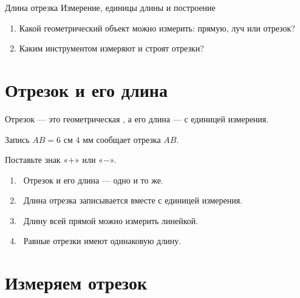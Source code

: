 
\worksheettitle
  {Длина отрезка}
  {Измерение, единицы длины и построение}

\studentnameblock

\begin{checkpointbox}
  \begin{enumerate}[label=\textbf{\arabic*.},itemsep=0.45em]
    \item Какой геометрический объект можно измерить: прямую, луч или
      отрезок? \answerblank[38mm]
    \item Каким инструментом измеряют и строят отрезки?
      \answerblank[42mm]
  \end{enumerate}
\end{checkpointbox}

\section{Отрезок и его длина}

\segmentlengthfigure

\begin{fillbox}[Дополните]
  Отрезок — это геометрическая \answerblank[30mm], а его длина —
  \answerblank[28mm] с единицей измерения.

  Запись \(AB=6\text{ см }4\text{ мм}\) сообщает
  \answerblank[50mm] отрезка \(AB\).
\end{fillbox}

\begin{practicebox}
  Поставьте знак «\(+\)» или «\(-\)».
  \begin{enumerate}[label=\textbf{\arabic*.},itemsep=0.38em]
    \item \choicebox\ Отрезок и его длина — одно и то же.
    \item \choicebox\ Длина отрезка записывается вместе с единицей измерения.
    \item \choicebox\ Длину всей прямой можно измерить линейкой.
    \item \choicebox\ Равные отрезки имеют одинаковую длину.
  \end{enumerate}
\end{practicebox}

\section{Измеряем отрезок}

